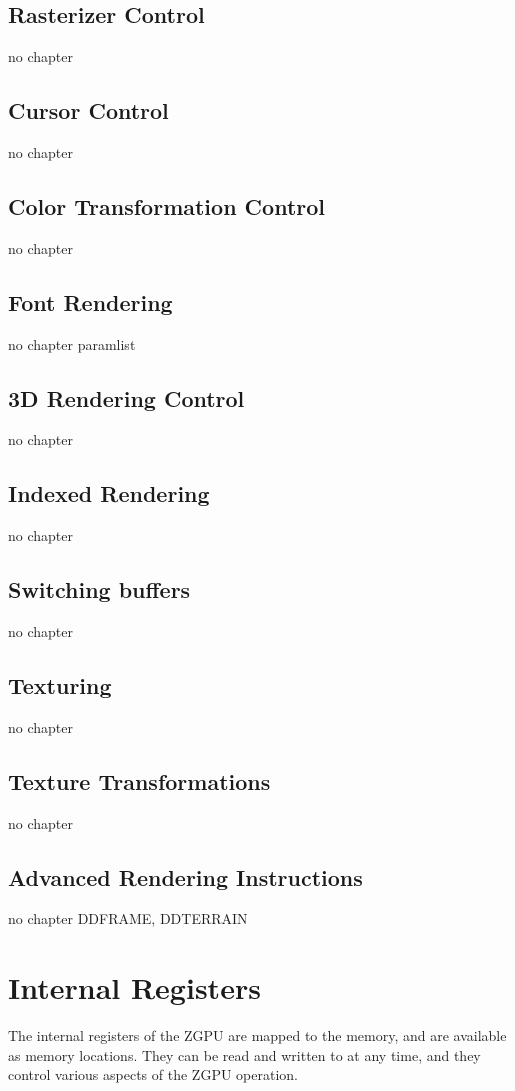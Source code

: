 \subsection{Rasterizer Control}
no chapter

\subsection{Cursor Control}
no chapter

\subsection{Color Transformation Control}
no chapter

\subsection{Font Rendering}
no chapter
paramlist

\subsection{3D Rendering Control}
no chapter

\subsection{Indexed Rendering}
no chapter

\subsection{Switching buffers} \label{gpubuffers}
no chapter

\subsection{Texturing} \label{gputexturing}
no chapter

\subsection{Texture Transformations}
no chapter

\subsection{Advanced Rendering Instructions}
no chapter
DDFRAME, DDTERRAIN



\section{Internal Registers} \label{gpuregs}
The internal registers of the ZGPU are mapped to the memory, and are available as memory locations. They can be read and written to at any time, and they control various aspects of the ZGPU operation.

